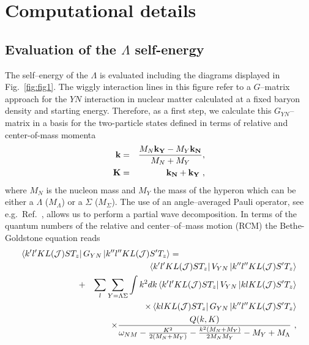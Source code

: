 \section{Computational details}

\subsection{Evaluation of the $\Lambda$ self-energy}

The self--energy of the $\Lambda$ is evaluated including the
diagrams displayed in Fig.~\ref{fig:fig1}. The wiggly interaction lines
in this figure refer to a $G$--matrix approach for the $YN$ interaction
in nuclear matter calculated at a fixed baryon density and starting
energy. Therefore, as a first step, we calculate this 
$G_{YN}$--matrix in a basis for the two-particle states defined
in terms of relative and center-of-mass momenta 
\begin{eqnarray*}
 {\bf k} &=&\frac{M_N{\bf k_Y}-M_Y{\bf k_N}}{M_N+M_Y}, \\
  {\bf K}&=&{\bf k_N}+{\bf k_Y} \ ,
\end{eqnarray*}
where $M_N$ is the nucleon mass and $M_Y$ the mass of the hyperon
which can be either a $\Lambda$ ($M_\Lambda$) or a $\Sigma$
($M_\Sigma$). The use of an angle--averaged Pauli operator,
see e.g.\ Ref.\  \cite{reuber},
allows us to perform a partial wave decomposition. In terms of the
quantum numbers of the relative and center--of--mass motion (RCM) the
Bethe-Goldstone equation reads
\begin{eqnarray}
\lefteqn{\left\langle k'l'KL({\cal J})S T_z\right |
      G_{YN}\left | k''l''KL({\cal J})S' T_z \right\rangle
      =} \hspace{2cm}\nonumber\\
  && \left\langle k'l'KL({\cal J})S T_z\right |
      V_{YN}\left | k''l''KL({\cal J})S' T_z \right\rangle
      \nonumber \\
      &\quad +& {\displaystyle
      \sum_{l}\sum_{Y=\Lambda\Sigma}\int k^{2}dk}
      \left\langle k'l'KL({\cal J})S T_z\right |
      V_{YN}\left | klKL({\cal J})S' T_z \right\rangle \nonumber \\
      && \times\left\langle klKL({\cal J})S T_z\right |
      G_{YN}\left | k''l''KL({\cal J})S' T_z \right\rangle\nonumber \\
      && \times \frac{Q(k,K)}{\omega_{NM} -\frac{K^2}{2(M_N+M_Y)} -
      \frac{k^2(M_N+M_Y)}{2M_NM_Y}-M_Y+M_\Lambda} \ ,
   \label{eq:gmat}
\end{eqnarray}
